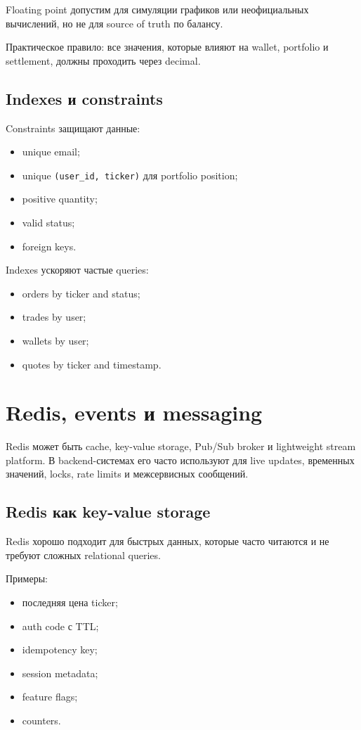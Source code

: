 \documentclass[12pt,a4paper]{article}
\begin{document}
Floating point допустим для симуляции графиков или неофициальных вычислений, но
не для source of truth по балансу.

Практическое правило: все значения, которые влияют на wallet, portfolio и
settlement, должны проходить через decimal.

\subsection{Indexes и constraints}

Constraints защищают данные:
\begin{itemize}
    \item unique email;
    \item unique \texttt{(user\_id, ticker)} для portfolio position;
    \item positive quantity;
    \item valid status;
    \item foreign keys.
\end{itemize}

Indexes ускоряют частые queries:
\begin{itemize}
    \item orders by ticker and status;
    \item trades by user;
    \item wallets by user;
    \item quotes by ticker and timestamp.
\end{itemize}

\newpage
\section{Redis, events и messaging}

Redis может быть cache, key-value storage, Pub/Sub broker и lightweight stream
platform. В backend-системах его часто используют для live updates, временных
значений, locks, rate limits и межсервисных сообщений.

\subsection{Redis как key-value storage}

Redis хорошо подходит для быстрых данных, которые часто читаются и не требуют
сложных relational queries.

Примеры:
\begin{itemize}
    \item последняя цена ticker;
    \item auth code с TTL;
    \item idempotency key;
    \item session metadata;
    \item feature flags;
    \item counters.
\end{itemize}
\end{document}
